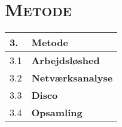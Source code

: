 

\chapter{\textsc{Metode}} \label{metode}

\begin{table}[h] 
\begin{tabular}{@{}||l||l||@{}} \hline \hline 
 3.	 & \textbf{Metode} \\ \hline \hline
 3.1 & \textbf{Arbejdsløshed} \\ \hline \hline
 3.2 & \textbf{Netværksanalyse} \\ \hline \hline
 3.3 & \textbf{Disco} \\ \hline \hline
 3.4 & \textbf{Opsamling} \\ \hline \hline
\end{tabular} \end{table}





